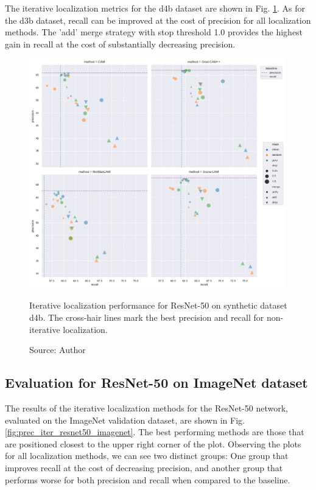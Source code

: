The iterative localization metrics for the d4b dataset are shown in Fig. \ref{fig:prec_iter_resnet50_syn_d4b}. As for the d3b dataset, recall can be improved at the cost of precision for all localization methods. The 'add' merge strategy with stop threshold 1.0 provides the highest gain in recall at the cost of substantially decreasing precision.

\begin{figure}[h]
    \begin{center}       
    \includegraphics[width=0.99\textwidth]{images/fig_iter_resnet50_syn_d4b.png}
    \caption[Iterative localization performance for ResNet-50 on synthetic dataset d4b]{Iterative localization performance for ResNet-50 on synthetic dataset d4b. The cross-hair lines mark the best precision and recall for non-iterative localization.}
    \caption*{Source: Author}
    \label{fig:prec_iter_resnet50_syn_d4b}
    \end{center}
\end{figure}

\subsection{Evaluation for ResNet-50 on ImageNet dataset}

The results of the iterative localization methods for the ResNet-50 network, evaluated on the ImageNet validation dataset, are shown in Fig. \ref{fig:prec_iter_resnet50_imagenet}. The best performing methods are those that are positioned closest to the upper right corner of the plot. Observing the plots for all localization methods, we can see two distinct groups: One group that improves recall at the cost of decreasing precision, and another group that performs worse for both precision and recall when compared to the baseline.

